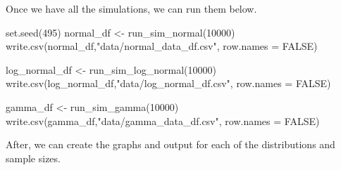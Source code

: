 \documentclass[12pt]{article}
\newenvironment{Shaded}{\begin{snugshade}}{\end{snugshade}}
\newcommand{\AttributeTok}[1]{\textcolor[rgb]{0.77,0.63,0.00}{#1}}
\newcommand{\ConstantTok}[1]{\textcolor[rgb]{0.00,0.00,0.00}{#1}}
\newcommand{\DecValTok}[1]{\textcolor[rgb]{0.00,0.00,0.81}{#1}}
\newcommand{\FunctionTok}[1]{\textcolor[rgb]{0.00,0.00,0.00}{#1}}
\newcommand{\NormalTok}[1]{#1}
\newcommand{\OtherTok}[1]{\textcolor[rgb]{0.56,0.35,0.01}{#1}}
\newcommand{\StringTok}[1]{\textcolor[rgb]{0.31,0.60,0.02}{#1}}
\begin{document}
Once we have all the simulations, we can run them below.

\begin{Shaded}
\begin{Highlighting}[]
\FunctionTok{set.seed}\NormalTok{(}\DecValTok{495}\NormalTok{)}
\NormalTok{normal\_df }\OtherTok{\textless{}{-}} \FunctionTok{run\_sim\_normal}\NormalTok{(}\DecValTok{10000}\NormalTok{)}
\FunctionTok{write.csv}\NormalTok{(normal\_df,}\StringTok{"data/normal\_data\_df.csv"}\NormalTok{, }\AttributeTok{row.names =} \ConstantTok{FALSE}\NormalTok{)}

\NormalTok{log\_normal\_df }\OtherTok{\textless{}{-}} \FunctionTok{run\_sim\_log\_normal}\NormalTok{(}\DecValTok{10000}\NormalTok{)}
\FunctionTok{write.csv}\NormalTok{(log\_normal\_df,}\StringTok{"data/log\_normal\_df.csv"}\NormalTok{, }\AttributeTok{row.names =} \ConstantTok{FALSE}\NormalTok{)}

\NormalTok{gamma\_df }\OtherTok{\textless{}{-}} \FunctionTok{run\_sim\_gamma}\NormalTok{(}\DecValTok{10000}\NormalTok{)}
\FunctionTok{write.csv}\NormalTok{(gamma\_df,}\StringTok{"data/gamma\_data\_df.csv"}\NormalTok{, }\AttributeTok{row.names =} \ConstantTok{FALSE}\NormalTok{)}
\end{Highlighting}
\end{Shaded}

After, we can create the graphs and output for each of the distributions
and sample sizes.
\end{document}
